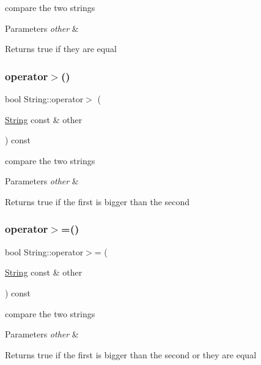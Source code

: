 compare the two strings 
\begin{DoxyParams}{Parameters}
{\em other} & \\
\hline
\end{DoxyParams}
\begin{DoxyReturn}{Returns}
true if they are equal 
\end{DoxyReturn}
\mbox{\label{classString_a4b9b4c9eab5759a848229a8209ac3ddf}} 
\subsubsection{\texorpdfstring{operator$>$()}{operator>()}}
{\footnotesize\ttfamily bool String\+::operator$>$ (\begin{DoxyParamCaption}\item[{\hyperlink{classString}{String} const \&}]{other }\end{DoxyParamCaption}) const}

compare the two strings 
\begin{DoxyParams}{Parameters}
{\em other} & \\
\hline
\end{DoxyParams}
\begin{DoxyReturn}{Returns}
true if the first is bigger than the second 
\end{DoxyReturn}
\mbox{\label{classString_a21e5e59295a87f0af5b082c294c12f11}} 
\subsubsection{\texorpdfstring{operator$>$=()}{operator>=()}}
{\footnotesize\ttfamily bool String\+::operator$>$= (\begin{DoxyParamCaption}\item[{\hyperlink{classString}{String} const \&}]{other }\end{DoxyParamCaption}) const}

compare the two strings 
\begin{DoxyParams}{Parameters}
{\em other} & \\
\hline
\end{DoxyParams}
\begin{DoxyReturn}{Returns}
true if the first is bigger than the second or they are equal 
\end{DoxyReturn}
\mbox{\label{classString_ab0c13e38cf91f55bb6eaedd513f124db}} 
